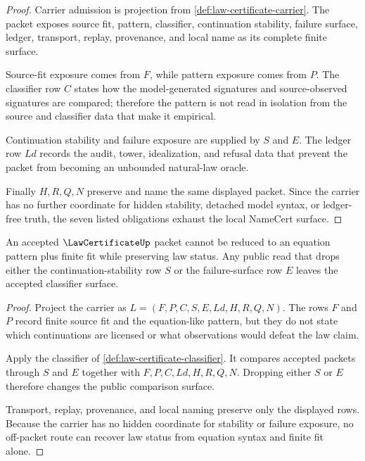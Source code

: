 \begin{proof}
Carrier admission is projection from \autoref{def:law-certificate-carrier}. The packet exposes source fit, pattern, classifier, continuation stability, failure surface, ledger, transport, replay, provenance, and local name as its complete finite surface.

Source-fit exposure comes from $F$, while pattern exposure comes from $P$. The classifier row $C$ states how the model-generated signatures and source-observed signatures are compared; therefore the pattern is not read in isolation from the source and classifier data that make it empirical.

Continuation stability and failure exposure are supplied by $S$ and $E$. The ledger row $Ld$ records the audit, tower, idealization, and refusal data that prevent the packet from becoming an unbounded natural-law oracle.

Finally $H,R,Q,N$ preserve and name the same displayed packet. Since the carrier has no further coordinate for hidden stability, detached model syntax, or ledger-free truth, the seven listed obligations exhaust the local NameCert surface.
\end{proof}

\begin{theorem}
\label{thm:law-certificate-failure-surface-nonescape}
An accepted $\LawCertificateUp$ packet cannot be reduced to an equation pattern plus finite fit while preserving law status. Any public read that drops either the continuation-stability row $S$ or the failure-surface row $E$ leaves the accepted classifier surface.
\end{theorem}
\begin{proof}
Project the carrier as $L=(F,P,C,S,E,Ld,H,R,Q,N)$. The rows $F$ and $P$ record finite source fit and the equation-like pattern, but they do not state which continuations are licensed or what observations would defeat the law claim.

Apply the classifier of \autoref{def:law-certificate-classifier}. It compares accepted packets through $S$ and $E$ together with $F,P,C,Ld,H,R,Q,N$. Dropping either $S$ or $E$ therefore changes the public comparison surface.

Transport, replay, provenance, and local naming preserve only the displayed rows. Because the carrier has no hidden coordinate for stability or failure exposure, no off-packet route can recover law status from equation syntax and finite fit alone.
\end{proof}

